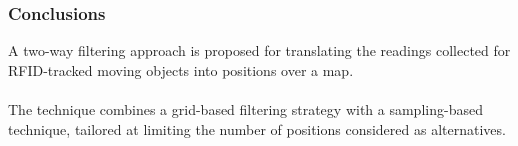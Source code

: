 \begin{frame}
\begin{columns}
\end{columns}

\end{frame}


\begin{frame}
\frametitle{Conclusions}

A two-way filtering approach is proposed for translating the readings collected for RFID-tracked moving objects into positions over a map.\\~\\

The technique combines a grid-based filtering strategy with a sampling-based technique, tailored at limiting the number of positions considered as alternatives.

\end{frame}
